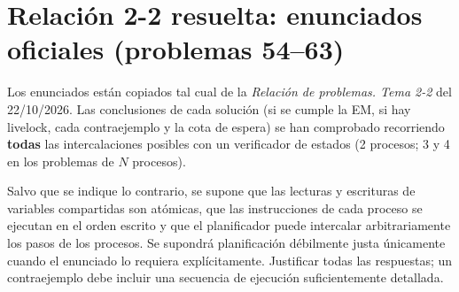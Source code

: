 \documentclass[11pt,a4paper,oneside]{report}
\begin{document}
\clearpage
\section{Relación 2-2 resuelta: enunciados oficiales (problemas 54--63)}\label{sec:relacion}

Los enunciados están copiados tal cual de la \emph{Relación de problemas. Tema 2-2} del 22/10/2026. Las
conclusiones de cada solución (si se cumple la EM, si hay livelock, cada contraejemplo y la cota de espera) se
han comprobado recorriendo \textbf{todas} las intercalaciones posibles con un verificador de estados (2 procesos;
3 y 4 en los problemas de $N$ procesos).

\begin{aviso}
Salvo que se indique lo contrario, se supone que las lecturas y escrituras de variables compartidas son
atómicas, que las instrucciones de cada proceso se ejecutan en el orden escrito y que el planificador puede
intercalar arbitrariamente los pasos de los procesos. Se supondrá planificación débilmente justa únicamente
cuando el enunciado lo requiera explícitamente. Justificar todas las respuestas; un contraejemplo debe incluir
una secuencia de ejecución suficientemente detallada.
\end{aviso}
\end{document}
